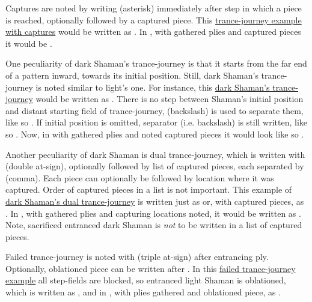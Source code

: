 Captures are noted by writing \alg{*} (asterisk) immediately after step in which
a piece is reached, optionally followed by a captured piece. This
\hyperref[fig:scn_cot_089_dark_light_shaman_interaction_end]{trance-journey example with captures}
would be written as\newline
{}. In , with gathered plies and captured
pieces it would be\newline
{}.

One peculiarity of dark Shaman's trance-journey is that it starts from the far end
of a pattern inward, towards its initial position. Still, dark Shaman's trance-journey
is noted similar to light's one. For instance, this
\hyperref[fig:scn_cot_090_dark_dark_shaman_interaction_start]{dark Shaman's trance-journey}
would be written as .
There is no step between Shaman's initial position and distant starting field of
trance-journey, \alg{\textbackslash} (backslash) is used to separate them, like so
.
If initial position is omitted, separator (i.e. backslash) is still written, like so
. Now, in  with gathered
plies and noted captured pieces it would look like so\newline
{}.

Another peculiarity of dark Shaman is dual trance-journey, which is written with 
(double at-sign), optionally followed by list of captured pieces, each separated by \alg{,}
(comma). Each piece can optionally be followed by location where it was captured. Order of
captured pieces in a list is not important. This example of
\hyperref[fig:scn_cot_092_dark_dark_shaman_double_interaction_start]{dark Shaman's dual trance-journey}
is written just as  or, with captured pieces, as
. In , with gathered plies and capturing locations noted,
it would be written as\newline
{}\newline
{}.\newline
Note, sacrificed entranced dark Shaman is \emph{not} to be written in a list of captured
pieces.

Failed trance-journey is noted with  (triple at-sign) after entrancing ply.
Optionally, oblationed piece can be written after . In this
\hyperref[fig:scn_o_36_trance_journey_failed]{failed trance-journey example} all
step-fields are blocked, so entranced light Shaman is oblationed, which is written as
, and in , with plies gathered and oblationed piece, as
.


